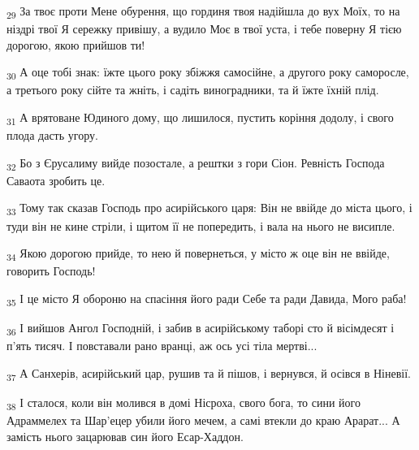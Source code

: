 \begin{tcolorbox}
\textsubscript{29} За твоє проти Мене обурення, що гординя твоя надійшла до вух Моїх, то на ніздрі твої Я сережку привішу, а вудило Моє в твої уста, і тебе поверну Я тією дорогою, якою прийшов ти!
\end{tcolorbox}
\begin{tcolorbox}
\textsubscript{30} А оце тобі знак: їжте цього року збіжжя самосійне, а другого року саморосле, а третього року сійте та жніть, і садіть виноградники, та й їжте їхній плід.
\end{tcolorbox}
\begin{tcolorbox}
\textsubscript{31} А врятоване Юдиного дому, що лишилося, пустить коріння додолу, і свого плода дасть угору.
\end{tcolorbox}
\begin{tcolorbox}
\textsubscript{32} Бо з Єрусалиму вийде позостале, а рештки з гори Сіон. Ревність Господа Саваота зробить це.
\end{tcolorbox}
\begin{tcolorbox}
\textsubscript{33} Тому так сказав Господь про асирійського царя: Він не ввійде до міста цього, і туди він не кине стріли, і щитом її не попередить, і вала на нього не висипле.
\end{tcolorbox}
\begin{tcolorbox}
\textsubscript{34} Якою дорогою прийде, то нею й повернеться, у місто ж оце він не ввійде, говорить Господь!
\end{tcolorbox}
\begin{tcolorbox}
\textsubscript{35} І це місто Я обороню на спасіння його ради Себе та ради Давида, Мого раба!
\end{tcolorbox}
\begin{tcolorbox}
\textsubscript{36} І вийшов Ангол Господній, і забив в асирійському таборі сто й вісімдесят і п'ять тисяч. І повставали рано вранці, аж ось усі тіла мертві...
\end{tcolorbox}
\begin{tcolorbox}
\textsubscript{37} А Санхерів, асирійський цар, рушив та й пішов, і вернувся, й осівся в Ніневії.
\end{tcolorbox}
\begin{tcolorbox}
\textsubscript{38} І сталося, коли він молився в домі Нісроха, свого бога, то сини його Адраммелех та Шар'ецер убили його мечем, а самі втекли до краю Арарат... А замість нього зацарював син його Есар-Хаддон.
\end{tcolorbox}
